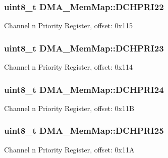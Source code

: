 \subsubsection[{D\+C\+H\+P\+R\+I22}]{\setlength{\rightskip}{0pt plus 5cm}uint8\+\_\+t D\+M\+A\+\_\+\+Mem\+Map\+::\+D\+C\+H\+P\+R\+I22}\label{struct_d_m_a___mem_map_a4a5d6f9d53dc792e4cd280791bdda559}
Channel n Priority Register, offset\+: 0x115 \hypertarget{struct_d_m_a___mem_map_af63f0406db2347f2e2df55ce783726b5}{}
\subsubsection[{D\+C\+H\+P\+R\+I23}]{\setlength{\rightskip}{0pt plus 5cm}uint8\+\_\+t D\+M\+A\+\_\+\+Mem\+Map\+::\+D\+C\+H\+P\+R\+I23}\label{struct_d_m_a___mem_map_af63f0406db2347f2e2df55ce783726b5}
Channel n Priority Register, offset\+: 0x114 \hypertarget{struct_d_m_a___mem_map_aa7a44ca4d68644b23788b2e8f857245b}{}
\subsubsection[{D\+C\+H\+P\+R\+I24}]{\setlength{\rightskip}{0pt plus 5cm}uint8\+\_\+t D\+M\+A\+\_\+\+Mem\+Map\+::\+D\+C\+H\+P\+R\+I24}\label{struct_d_m_a___mem_map_aa7a44ca4d68644b23788b2e8f857245b}
Channel n Priority Register, offset\+: 0x11\+B \hypertarget{struct_d_m_a___mem_map_ad3fdbf296bf5056b5b5cbc525aa2941c}{}
\subsubsection[{D\+C\+H\+P\+R\+I25}]{\setlength{\rightskip}{0pt plus 5cm}uint8\+\_\+t D\+M\+A\+\_\+\+Mem\+Map\+::\+D\+C\+H\+P\+R\+I25}\label{struct_d_m_a___mem_map_ad3fdbf296bf5056b5b5cbc525aa2941c}
Channel n Priority Register, offset\+: 0x11\+A \hypertarget{struct_d_m_a___mem_map_af17011bb74643176e41ef82482747d0e}{}
